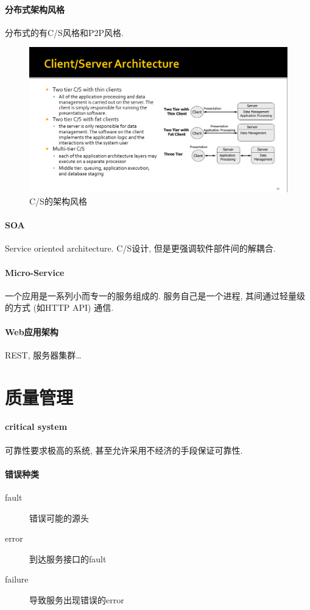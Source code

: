 \documentclass{ctexart}
\begin{document}
\paragraph{分布式架构风格}
    分布式的有C/S风格和P2P风格.
    \begin{figure}[ht!]
        \centering
        \includegraphics[width=\textwidth, height=\textheight, keepaspectratio]{csarch.png}
        \caption{C/S的架构风格}
    \end{figure}
\paragraph{SOA} Service oriented architecture. C/S设计, 但是更强调软件部件间的解耦合.
\paragraph{Micro-Service} 一个应用是一系列小而专一的服务组成的. 服务自己是一个进程,
    其间通过轻量级的方式 (如HTTP API) 通信. 
\paragraph{Web应用架构} REST, 服务器集群\ldots


\section{质量管理}
\paragraph{critical system}
    可靠性要求极高的系统, 甚至允许采用不经济的手段保证可靠性.
\paragraph{错误种类} \begin{description}
        \item[fault] 错误可能的源头
        \item[error] 到达服务接口的fault
        \item[failure] 导致服务出现错误的error
    \end{description}
\end{document}
